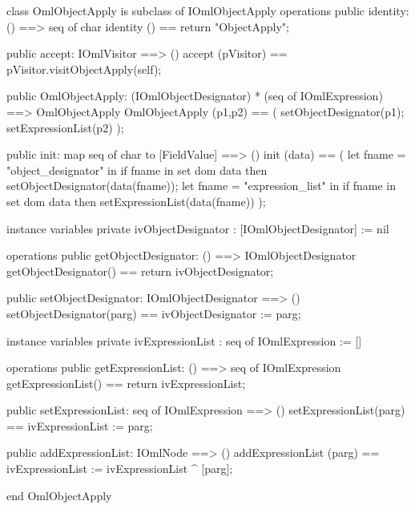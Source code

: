 \begin{vdm_al}
class OmlObjectApply is subclass of IOmlObjectApply
operations
  public identity: () ==> seq of char
  identity () == return "ObjectApply";

  public accept: IOmlVisitor ==> ()
  accept (pVisitor) == pVisitor.visitObjectApply(self);

  public OmlObjectApply:
      (IOmlObjectDesignator) *
      (seq of IOmlExpression) ==> OmlObjectApply
  OmlObjectApply (p1,p2) == 
   ( setObjectDesignator(p1);
     setExpressionList(p2) );

  public init: map seq of char to [FieldValue] ==> ()
  init (data) ==
    ( let fname = "object_designator" in
        if fname in set dom data
        then setObjectDesignator(data(fname));
      let fname = "expression_list" in
        if fname in set dom data
        then setExpressionList(data(fname)) );

instance variables
  private ivObjectDesignator : [IOmlObjectDesignator] := nil

operations
  public getObjectDesignator: () ==> IOmlObjectDesignator
  getObjectDesignator() == return ivObjectDesignator;

  public setObjectDesignator: IOmlObjectDesignator ==> ()
  setObjectDesignator(parg) == ivObjectDesignator := parg;

instance variables
  private ivExpressionList : seq of IOmlExpression := []

operations
  public getExpressionList: () ==> seq of IOmlExpression
  getExpressionList() == return ivExpressionList;

  public setExpressionList: seq of IOmlExpression ==> ()
  setExpressionList(parg) == ivExpressionList := parg;

  public addExpressionList: IOmlNode ==> ()
  addExpressionList (parg) == ivExpressionList := ivExpressionList ^ [parg];

end OmlObjectApply
\end{vdm_al}


